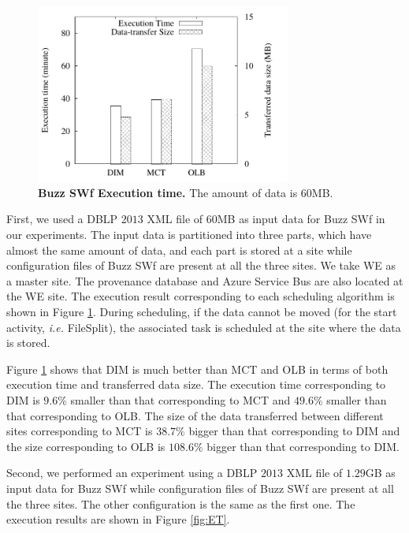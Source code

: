 \begin{figure}
\begin{centering}
\captionsetup{justification=centering}
\includegraphics[width=84mm]{figures/60buzz}
\par\end{centering}
\caption{\textbf{Buzz SWf Execution time.} The amount of data is $60$MB.}
\label{fig:Buzz60}
\end{figure}

First, we used a DBLP $2013$ XML file of $60$MB as input data for Buzz SWf in our experiments. The input data is partitioned into three parts, which have almost the same amount of data, and each part is stored at a site while configuration files of Buzz SWf are present at all the three sites. We take WE as a master site. The provenance database and Azure Service Bus are also located at the WE site.
The execution result corresponding to each scheduling algorithm is shown in Figure \ref{fig:Buzz60}. During scheduling, if the data cannot be moved (for the start activity, \textit{i.e.} FileSplit), the associated task is scheduled at the site where the data is stored.

Figure \ref{fig:Buzz60} shows that DIM is much better than MCT and OLB in terms of both execution time and transferred data size. The execution time corresponding to DIM is $9.6\%$ smaller than that corresponding to MCT and $49.6\%$ smaller than that corresponding to OLB. The size of the data transferred between different sites corresponding to MCT is $38.7\%$ bigger than that corresponding to DIM and the size corresponding to OLB is $108.6\%$ bigger than that corresponding to DIM. 

Second, we performed an experiment using a DBLP $2013$ XML file of $1.29$GB as input data for Buzz SWf while configuration files of Buzz SWf are present at all the three sites. The other configuration is the same as the first one. The execution results are shown in Figure \ref{fig:ET}. 

